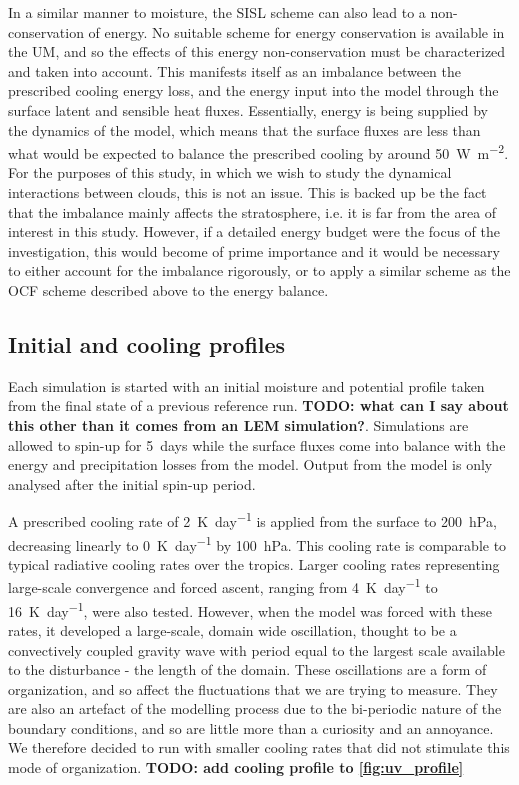 \documentclass[11pt,a4paper]{article}
\newcommand\todo[1]{\textbf{TODO: #1}}
\begin{document}
In a similar manner to moisture, the SISL scheme can also lead to a non-conservation of energy. No suitable scheme for energy conservation is available in the UM, and so the effects of this energy non-conservation must be characterized and taken into account. This manifests itself as an imbalance between the prescribed cooling energy loss, and the energy input into the model through the surface latent and sensible heat fluxes. Essentially, energy is being supplied by the dynamics of the model, which means that the surface fluxes are less than what would be expected to balance the prescribed cooling by around \SI{50}{W.m^{-2}}.
For the purposes of this study, in which we wish to study the dynamical interactions between clouds, this is not an issue. This is backed up be the fact that the imbalance mainly affects the stratosphere, i.e. it is far from the area of interest in this study. However, if a detailed energy budget were the focus of the investigation, this would become of prime importance and it would be necessary to either account for the imbalance rigorously, or to apply a similar scheme as the OCF scheme described above to the energy balance. 

\subsection{Initial and cooling profiles}

Each simulation is started with an initial moisture and potential profile taken from the final state of a previous reference run. \todo{what can I say about this other than it comes from an LEM simulation?}. Simulations are allowed to spin-up for \SI{5}{days} while the surface fluxes come into balance with the energy and precipitation losses from the model. Output from the model is only analysed after the initial spin-up period.

A prescribed cooling rate of \SI{2}{K.day^{-1}} is applied from the surface to \SI{200}{hPa}, decreasing linearly to \SI{0}{K.day^{-1}} by \SI{100}{hPa}. This cooling rate is comparable to typical radiative cooling rates over the tropics. Larger cooling rates representing large-scale convergence and forced ascent, ranging from \SI{4}{K.day^{-1}} to \SI{16}{K.day^{-1}}, were also tested. However, when the model was forced with these rates, it developed a large-scale, domain wide oscillation, thought to be a convectively coupled gravity wave with period equal to the largest scale available to the disturbance - the length of the domain. These oscillations are a form of organization, and so affect the fluctuations that we are trying to measure. They are also an artefact of the modelling process due to the bi-periodic nature of the boundary conditions, and so are little more than a curiosity and an annoyance. We therefore decided to run with smaller cooling rates that did not stimulate this mode of organization.
\todo{add cooling profile to \ref{fig:uv_profile}}
\end{document}
